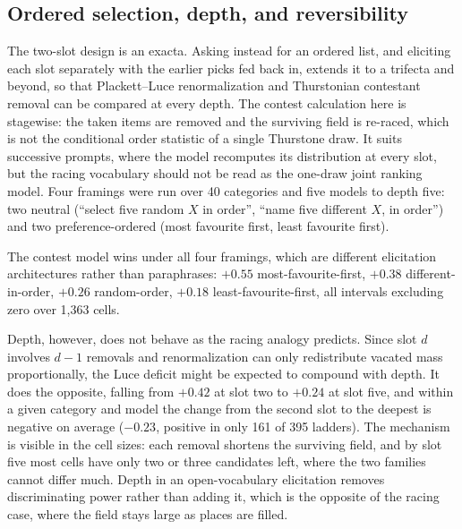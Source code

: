 \documentclass[11pt]{article}
\begin{document}
\subsection{Ordered selection, depth, and reversibility}
\label{sec:exotics}

The two-slot design is an exacta. Asking instead for an ordered list, and
eliciting each slot separately with the earlier picks fed back in, extends
it to a trifecta and beyond, so that Plackett--Luce \cite{plackett1975}
renormalization and Thurstonian contestant removal can be compared at
every depth. The contest calculation here is stagewise: the taken items are
removed and the surviving field is re-raced, which is not the conditional
order statistic of a single Thurstone draw. It suits successive prompts, where
the model recomputes its distribution at every slot, but the racing vocabulary
should not be read as the one-draw joint ranking model. Four framings were run over 40 categories and five models to
depth five: two neutral (``select five random $X$ in order'', ``name five
different $X$, in order'') and two preference-ordered (most favourite
first, least favourite first).

The contest model wins under all four framings, which are different
elicitation architectures rather than paraphrases: $+0.55$
most-favourite-first, $+0.38$ different-in-order, $+0.26$ random-order,
$+0.18$ least-favourite-first, all intervals excluding zero over 1{,}363
cells.

Depth, however, does not behave as the racing analogy predicts. Since
slot $d$ involves $d-1$ removals and renormalization can only redistribute
vacated mass proportionally, the Luce deficit might be expected to compound
with depth. It does the opposite, falling from $+0.42$ at slot two to
$+0.24$ at slot five, and within a given category and model the change from
the second slot to the deepest is negative on average ($-0.23$, positive in
only 161 of 395 ladders). The mechanism is visible in the cell sizes: each
removal shortens the surviving field, and by slot five most cells have only
two or three candidates left, where the two families cannot differ much.
Depth in an open-vocabulary elicitation removes discriminating power rather
than adding it, which is the opposite of the racing case, where the field
stays large as places are filled.
\end{document}
